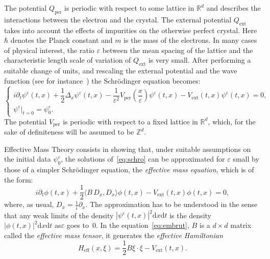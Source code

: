 \documentclass[10pt]{amsart}
\theoremstyle{definition}
\DeclareMathOperator{\ext}{ext}
\DeclareMathOperator{\per}{per}
\DeclareMathOperator{\eff}{eff}
\newcommand*\R{{\mathbb R}}
\newcommand*\Z{{\mathbb Z}}
\newcommand*\eps{\varepsilon}
\numberwithin{equation}{section}
\newcommand*{\dd}{\mathrm{d}}
\newcommand*{\dt}{\dd t}
\newcommand*{\dx}{\dd x}
\begin{document}
The potential $Q_{\per}$ is periodic with respect to some lattice in $\R^d$ and describes the interactions between the electron and the crystal. The external potential $Q_{\ext}$ takes into account the effects of impurities on the otherwise perfect crystal. Here $\hbar$ denotes the Planck constant and $m$ is the mass of the electrons. In many cases of physical interest, the ratio $\eps$ between the mean spacing of the lattice and the characteristic length scale of variation of $Q_{\ext}$ is very small. After performing a suitable change of units, and rescaling the external potential and the wave function (see for instance~\cite{PR96}) the Schr\"odinger equation becomes:
\begin{equation}\label{eq:schro}
\begin{cases}
i\partial_t \psi^\eps (t,x)+\dfrac{1}{2} \Delta_x \psi^\eps(t,x) - \dfrac{1}{\eps^{2}} V_{\per}\left(\dfrac{x}{\eps}\right)\psi^\eps(t,x) - V_{\ext}(t,x)\psi^\eps(t,x) =0,\\
\psi^\eps |_{t=0}=\psi^\eps_0.
\end{cases}
\end{equation}
The potential $V_{\per}$ is periodic with respect to a fixed lattice in $\R^d$, which, for the sake of definiteness will be assumed to be $\Z^d$.




Effective Mass Theory consists in showing that, under suitable assumptions on the initial data $\psi^\eps_0$, the solutions of~\eqref{eq:schro} can be approximated for $\eps$ small by those of a simpler Schr\"odinger equation, the \emph{effective mass equation}, which is of the form:
\begin{equation}\label{eq:embrut}
i\partial_t \phi (t,x)+\dfrac{1}{2}\langle B\, D_x,D_x\rangle\phi(t,x) - V_{\ext}(t,x)\phi(t,x)=0,
\end{equation}
where, as usual, $D_x=\frac{1}{i}\partial_x$. The approximation has to be understood in the sense that any weak limits of the density $|\psi^\eps(t,x)|^2\dx\dt$ is the density $|\phi(t,x)|^2\dx\dt$ as\linebreak $\eps$ goes to~$0$. In the equation~\eqref{eq:embrut}, $B$ is a $d\times d$ matrix called the \emph{effective mass tensor}, it generates the \emph{effective Hamiltonian}
\[
H_{\eff}(x,\xi) = \frac{1}{2}B\xi\cdot \xi -V_{\ext}(t,x).
\]
\end{document}
